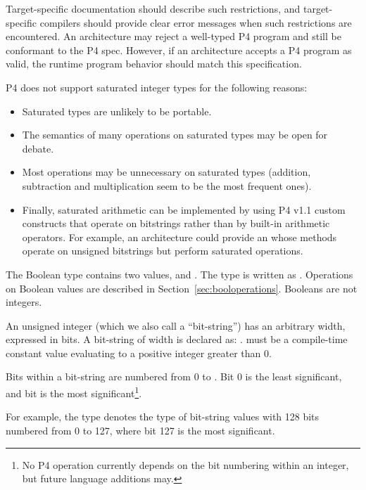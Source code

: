 \documentclass[12pt]{article}
\begin{document}
Target-specific documentation should describe such restrictions, and
target-specific compilers should provide clear error messages when
such restrictions are encountered.  An architecture may reject a
well-typed P4 program and still be conformant to the P4 spec.
However, if an architecture accepts a P4 program as valid, the runtime
program behavior should match this specification.


P4 does not support saturated integer types for the following reasons:

\begin{itemize}
\item Saturated types are unlikely to be portable.
\item The semantics of many operations on saturated types may be open
  for debate.
\item Most operations may be unnecessary on saturated types (addition,
  subtraction and multiplication seem to be the most frequent ones).
\item Finally, saturated arithmetic can be implemented by using P4
  v1.1  custom constructs that operate on bitstrings
  rather than by built-in arithmetic operators.  For example, an
  architecture could provide an  whose
  methods operate on unsigned bitstrings but perform saturated
  operations.
\end{itemize}


The Boolean type contains two values,  and
.  The type is written as \bool.  Operations on
Boolean values are described in Section~\ref{sec:booloperations}.
Booleans are not integers.


An unsigned integer (which we also call a ``bit-string'') has an
arbitrary width, expressed in bits.  A bit-string of width \W{} is
declared as: \bit{\W}.  \W{} must be a compile-time constant value
evaluating to a positive integer greater than 0.

Bits within a bit-string are numbered from 0 to .  Bit 0 is the
least significant, and bit  is the most significant\footnote{No P4
  operation currently depends on the bit numbering within an integer,
  but future language additions may.}.

For example, the type  denotes the type of bit-string
values with 128 bits numbered from 0 to 127, where bit 127 is the most
significant.
\end{document}
